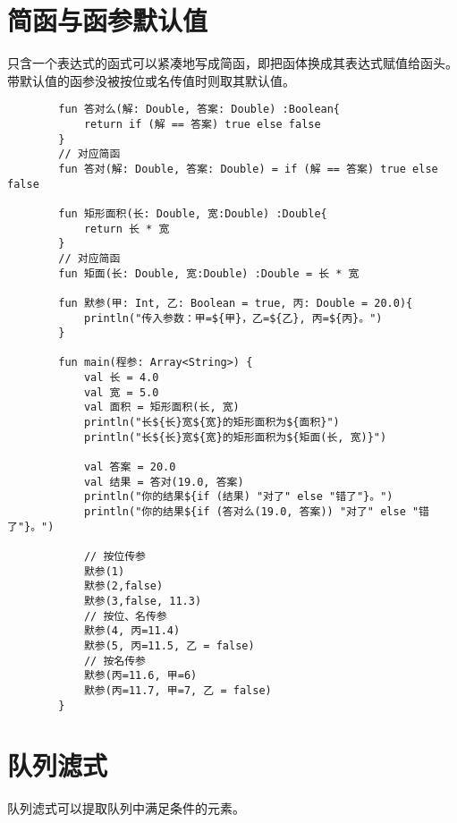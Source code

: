 \section{简函与函参默认值}
只含一个表达式的函式可以紧凑地写成简函，即把函体换成其表达式赋值给函头。带默认值的函参没被按位或名传值时则取其默认值。
    \begin{verbatim}
        fun 答对么(解: Double, 答案: Double) :Boolean{
            return if (解 == 答案) true else false
        }
        // 对应简函
        fun 答对(解: Double, 答案: Double) = if (解 == 答案) true else false

        fun 矩形面积(长: Double, 宽:Double) :Double{
            return 长 * 宽
        }
        // 对应简函
        fun 矩面(长: Double, 宽:Double) :Double = 长 * 宽

        fun 默参(甲: Int, 乙: Boolean = true, 丙: Double = 20.0){
            println("传入参数：甲=${甲}，乙=${乙}, 丙=${丙}。")
        }

        fun main(程参: Array<String>) {
            val 长 = 4.0
            val 宽 = 5.0
            val 面积 = 矩形面积(长, 宽)
            println("长${长}宽${宽}的矩形面积为${面积}")
            println("长${长}宽${宽}的矩形面积为${矩面(长, 宽)}")

            val 答案 = 20.0
            val 结果 = 答对(19.0, 答案)
            println("你的结果${if (结果) "对了" else "错了"}。")
            println("你的结果${if (答对么(19.0, 答案)) "对了" else "错了"}。")

            // 按位传参
            默参(1)
            默参(2,false)
            默参(3,false, 11.3)
            // 按位、名传参
            默参(4, 丙=11.4)
            默参(5, 丙=11.5, 乙 = false)
            // 按名传参
            默参(丙=11.6, 甲=6)
            默参(丙=11.7, 甲=7, 乙 = false)
        }
    \end{verbatim}

\section{队列滤式}
队列滤式可以提取队列中满足条件的元素。

